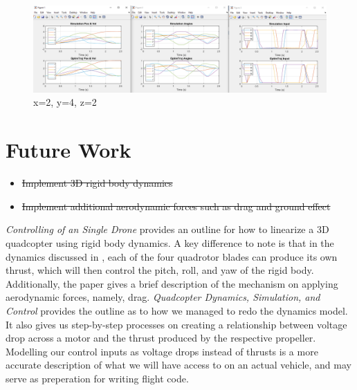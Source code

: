 \documentclass[12pt]{article}
\begin{document}
\begin{figure}[H]
\centerline{\includegraphics[scale=0.45]{2_4_2.PNG}}
  \caption{\label{2_4_2} x=2, y=4, z=2}
  \label{fig}
\end{figure}


\section{Future Work}

\begin{itemize}
  \item \sout{Implement 3D rigid body dynamics}
  \item \sout{Implement additional aerodynamic forces such as drag and ground effect}
\end{itemize}
\textit{Controlling of an Single Drone}\cite{Controlling of an Single Drone} provides an outline for how to linearize a 3D quadcopter using rigid body dynamics. A key difference to note is that in the dynamics discussed in {\cite{Controlling of an Single Drone}, each of the four quadrotor blades can produce its own thrust, which will then control the pitch, roll, and yaw of the rigid body. Additionally, the paper gives a brief description of the mechanism on applying aerodynamic forces, namely, drag.}
\newline
\newline
\textit{Quadcopter Dynamics, Simulation, and Control}\cite{QDSC} provides the outline as to how we managed to redo the dynamics model. It also gives us step-by-step processes on creating a relationship between voltage drop across a motor and the thrust produced by the respective propeller.  Modelling our control inputs as voltage drops instead of thrusts is a more accurate description of what we will have access to on an actual vehicle, and may serve as preperation for writing flight code.
\end{document}
